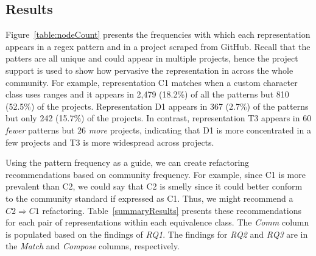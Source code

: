 \subsection{Results}
Figure~\ref{table:nodeCount} presents the frequencies with which each representation appears in a regex pattern and in a project scraped from GitHub. Recall that the patters are all unique and could appear in multiple projects, hence the project support is used to show how pervasive the representation in across the whole community. For example, representation C1 matches when a custom character class uses ranges and it appears in 2,479 (18.2\%) of all the patterns but 810 (52.5\%) of the projects. Representation D1 appears in 367 (2.7\%) of the patterns but only 242 (15.7\%) of the projects. In contrast, representation T3 appears in 60 \emph{fewer} patterns but 26 \emph{more} projects, indicating that D1 is more concentrated in a few projects and T3 is more widespread across projects.

Using the pattern frequency as a guide, we can create refactoring recommendations based on community frequency. For example, since C1 is more prevalent than C2, we could say that C2 is smelly since it could better conform to the community standard if expressed as C1. Thus, we might recommend a $C2 \Rightarrow C1$ refactoring. Table~\ref{summaryResults} presents these recommendations for each pair of representations within each equivalence class. The \emph{Comm} column is populated based on the findings of \emph{RQ1}. The findings for \emph{RQ2} and \emph{RQ3} are in the \emph{Match} and \emph{Compose} columns, respectively.






